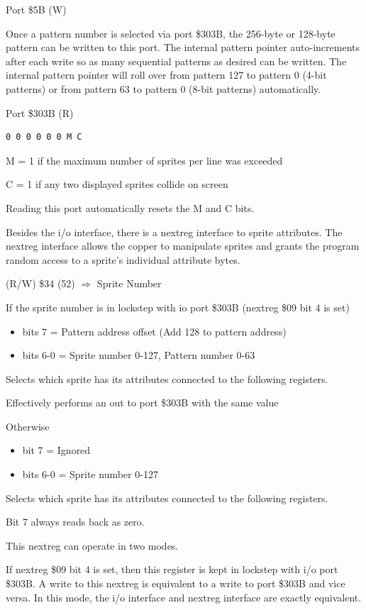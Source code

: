 Port \$5B (W)

Once a pattern number is selected via port \$303B, the 256-byte or
128-byte pattern can be written to this port. The internal pattern
pointer auto-increments after each write so as many sequential
patterns as desired can be written. The internal pattern pointer will
roll over from pattern 127 to pattern 0 (4-bit patterns) or from
pattern 63 to pattern 0 (8-bit patterns) automatically.

Port \$303B (R)

\begin{verbatim}
0 0 0 0 0 0 M C
\end{verbatim}
M = 1 if the maximum number of sprites per line was exceeded

C = 1 if any two displayed sprites collide on screen

Reading this port automatically resets the M and C bits.

Besides the i/o interface, there is a nextreg interface to sprite
attributes. The nextreg interface allows the copper to manipulate
sprites and grants the program random access to a sprite’s individual
attribute bytes.

(R/W) \$34 (52) $\Rightarrow$ Sprite Number

If the sprite number is in lockstep with io port \$303B (nextreg \$09
bit 4 is set)
\begin{itemize}
\item[] bits 7 = Pattern address offset (Add 128 to pattern address)
\item[] bits 6-0 = Sprite number 0-127, Pattern number 0-63
\end{itemize}
Selects which sprite has its attributes connected to the following registers.

Effectively performs an out to port \$303B with the same value

Otherwise
\begin{itemize}
\item[] bit 7 = Ignored
\item[] bits 6-0 = Sprite number 0-127
\end{itemize}
Selects which sprite has its attributes connected to the following registers.

Bit 7 always reads back as zero.

This nextreg can operate in two modes.

If nextreg \$09 bit 4 is set, then this register is kept in lockstep
with i/o port \$303B. A write to this nextreg is equivalent to a write
to port \$303B and vice versa. In this mode, the i/o interface and
nextreg interface are exactly equivalent.


